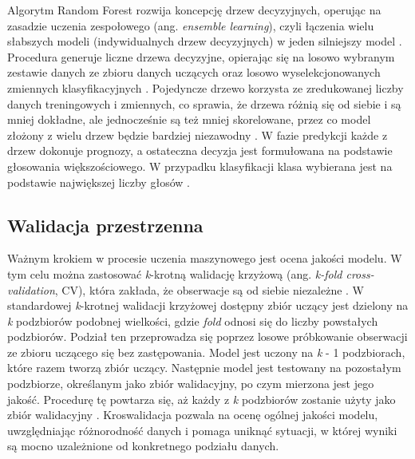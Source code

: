 \documentclass{amuthesis}
\begin{document}
Algorytm Random Forest rozwija koncepcję drzew decyzyjnych, operując na
zasadzie uczenia zespołowego (ang. \emph{ensemble learning}), czyli
łączenia wielu słabszych modeli (indywidualnych drzew decyzyjnych) w
jeden silniejszy model
\autocite{aaron_2018_ml,sekulic_2020_rf_interpolation}. Procedura
generuje liczne drzewa decyzyjne, opierając się na losowo wybranym
zestawie danych ze zbioru danych uczących oraz losowo wyselekcjonowanych
zmiennych klasyfikacyjnych \autocite{breiman_2001_rf}. Pojedyncze drzewo
korzysta ze zredukowanej liczby danych treningowych i zmiennych, co
sprawia, że drzewa różnią się od siebie i są mniej dokładne, ale
jednocześnie są też mniej skorelowane, przez co model złożony z wielu
drzew będzie bardziej niezawodny
\autocite{sekulic_2020_rf_interpolation}. W fazie predykcji każde z
drzew dokonuje prognozy, a ostateczna decyzja jest formułowana na
podstawie głosowania większościowego. W przypadku klasyfikacji klasa
wybierana jest na podstawie największej liczby głosów
\autocite{breiman_2001_rf}.

\hypertarget{sec-spcv}{%
\subsection{Walidacja przestrzenna}\label{sec-spcv}}

Ważnym krokiem w procesie uczenia maszynowego jest ocena jakości modelu.
W tym celu można zastosować \emph{k}-krotną walidację krzyżową (ang.
\emph{k-fold cross-validation}, CV), która zakłada, że obserwacje są od
siebie niezależne \autocite{pohjankukka_2017_scv}. W standardowej
\emph{k}-krotnej walidacji krzyżowej dostępny zbiór uczący jest dzielony
na \emph{k} podzbiorów podobnej wielkości, gdzie \emph{fold} odnosi się
do liczby powstałych podzbiorów. Podział ten przeprowadza się poprzez
losowe próbkowanie obserwacji ze zbioru uczącego się bez zastępowania.
Model jest uczony na \emph{k} - 1 podzbiorach, które razem tworzą zbiór
uczący. Następnie model jest testowany na pozostałym podzbiorze,
określanym jako zbiór walidacyjny, po czym mierzona jest jego jakość.
Procedurę tę powtarza się, aż każdy z \emph{k} podzbiorów zostanie użyty
jako zbiór walidacyjny \autocite{berrar_2018_cv}. Kroswalidacja pozwala
na ocenę ogólnej jakości modelu, uwzględniając różnorodność danych i
pomaga uniknąć sytuacji, w której wyniki są mocno uzależnione od
konkretnego podziału danych.
\end{document}
